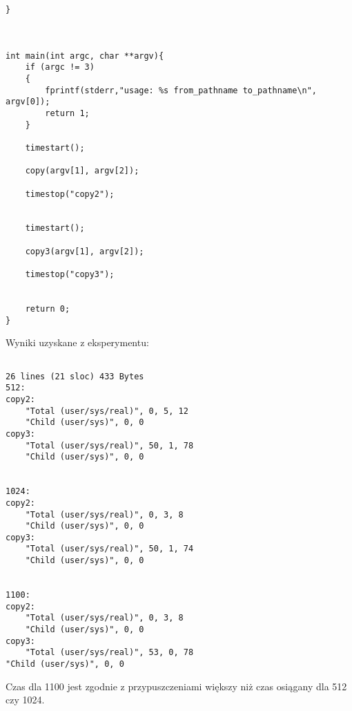 \documentclass[a4paper,15pt]{article}
\begin{document}
\begin{lstlisting}[style=CStyle, label=some-code, caption=timecmp.c]
}



int main(int argc, char **argv){
	if (argc != 3)
	{
		fprintf(stderr,"usage: %s from_pathname to_pathname\n", argv[0]);
		return 1;
	}
	
	timestart();
	
	copy(argv[1], argv[2]);
	
	timestop("copy2");
	
	
	timestart();
	
	copy3(argv[1], argv[2]);
	
	timestop("copy3");
	
	
	return 0;
}

\end{lstlisting}


Wyniki uzyskane z eksperymentu: 

\begin{lstlisting}[style=CStyle, label=some-code, caption=Logi z programu timecmp.c]

26 lines (21 sloc) 433 Bytes
512: 
copy2:
	"Total (user/sys/real)", 0, 5, 12
	"Child (user/sys)", 0, 0
copy3:
	"Total (user/sys/real)", 50, 1, 78
	"Child (user/sys)", 0, 0


1024: 
copy2:
	"Total (user/sys/real)", 0, 3, 8
	"Child (user/sys)", 0, 0
copy3:
	"Total (user/sys/real)", 50, 1, 74
	"Child (user/sys)", 0, 0


1100: 
copy2:
	"Total (user/sys/real)", 0, 3, 8
	"Child (user/sys)", 0, 0
copy3:
	"Total (user/sys/real)", 53, 0, 78
"Child (user/sys)", 0, 0
\end{lstlisting}

Czas dla 1100 jest zgodnie z przypuszczeniami większy niż czas osiągany dla 512 czy 1024.
\end{document}
